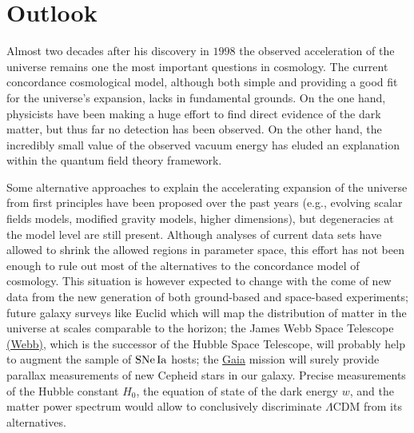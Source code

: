\chapter{Outlook}
\label{chapter-outlook}

Almost two decades after his discovery in $1998$ the observed acceleration of the universe remains one the most important questions in cosmology. The current concordance cosmological model, although both simple and providing a good fit for the universe's expansion, lacks in fundamental grounds. On the one hand, physicists have been making a huge effort to find direct evidence of the dark matter, but thus far no detection has been observed. On the other hand, the incredibly small value of the observed vacuum energy has eluded an explanation within the quantum field theory framework. 

Some alternative approaches to explain the accelerating expansion of the universe from first principles have been proposed over the past years (e.g., evolving scalar fields models, modified gravity models, higher dimensions), but degeneracies at the model level are still present. Although analyses of current data sets have allowed to shrink the allowed regions in parameter space, this effort has not been enough to rule out most of the alternatives to the concordance model of cosmology. This situation is however expected to change with the come of new data from the new generation of both ground-based and space-based experiments; future galaxy surveys like Euclid which will map the distribution of matter in the universe at scales comparable to the horizon; the James Webb Space Telescope \href{www.jwst.nasa.gov}{(Webb)}, which is the successor of the Hubble Space Telescope, will probably help to augment the sample of $\mathrm{SNe\,Ia}$ hosts; the \href{http://sci.esa.int/gaia/}{Gaia} mission will surely provide parallax measurements of new Cepheid stars in our galaxy. Precise measurements of the Hubble constant $H_0$, the equation of state of the dark energy $w$, and the matter power spectrum would allow to conclusively discriminate $\Lambda$CDM from its alternatives. 

